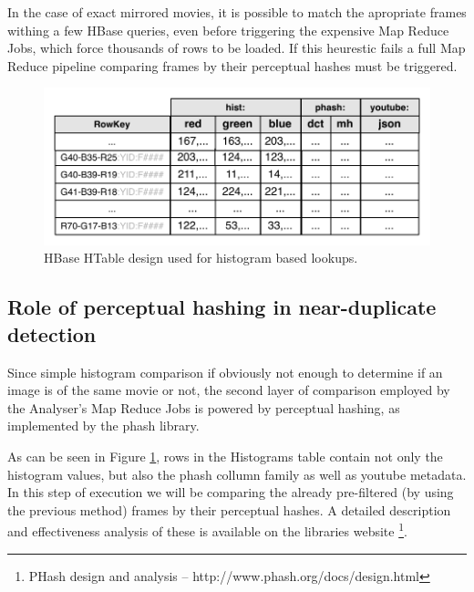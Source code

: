 In the case of exact mirrored movies, it is possible to match the apropriate frames withing a few HBase queries, even before triggering the expensive Map Reduce Jobs, which force thousands of rows to be loaded. If this heurestic fails a full Map Reduce pipeline comparing frames by their perceptual hashes must be triggered.

\begin{figure}[ch!]
  \centering
  \includegraphics[width=\textwidth]{img/hbase-hashes-table}
  \caption{HBase HTable design used for histogram based lookups.}
  \label{fig:histogram-table}
\end{figure}




\newpage
\subsection{Role of perceptual hashing in near-duplicate detection}
\label{sec:perceptual-hashing}
Since simple histogram comparison if obviously not enough to determine if an image is of the same movie or not,
the second layer of comparison employed by the Analyser's Map Reduce Jobs is powered by perceptual hashing, as implemented by the phash \cite{phash} library.

As can be seen in Figure \ref{fig:histogram-table}, rows in the Histograms table contain not only the histogram values, but also the phash collumn family as well as youtube metadata. In this step of execution we will be comparing the already pre-filtered (by using the previous method) frames by their perceptual hashes. A detailed description and effectiveness analysis of these is available on the libraries website \footnote{PHash design and analysis -- http://www.phash.org/docs/design.html}.

